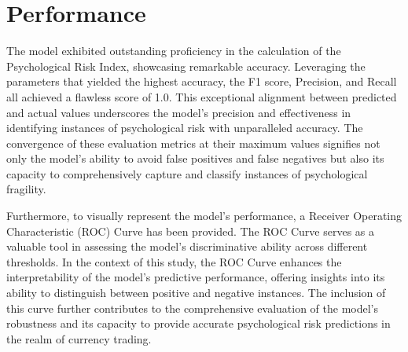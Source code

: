 \documentclass{article}
\begin{document}
\section{Performance}
The model exhibited outstanding proficiency in the calculation of the Psychological Risk Index, showcasing remarkable accuracy. Leveraging the parameters that yielded the highest accuracy, the F1 score, Precision, and Recall all achieved a flawless score of 1.0. This exceptional alignment between predicted and actual values underscores the model's precision and effectiveness in identifying instances of psychological risk with unparalleled accuracy. The convergence of these evaluation metrics at their maximum values signifies not only the model's ability to avoid false positives and false negatives but also its capacity to comprehensively capture and classify instances of psychological fragility.

Furthermore, to visually represent the model's performance, a Receiver Operating Characteristic (ROC) Curve has been provided. The ROC Curve serves as a valuable tool in assessing the model's discriminative ability across different thresholds. In the context of this study, the ROC Curve enhances the interpretability of the model's predictive performance, offering insights into its ability to distinguish between positive and negative instances. The inclusion of this curve further contributes to the comprehensive evaluation of the model's robustness and its capacity to provide accurate psychological risk predictions in the realm of currency trading.
\end{document}
